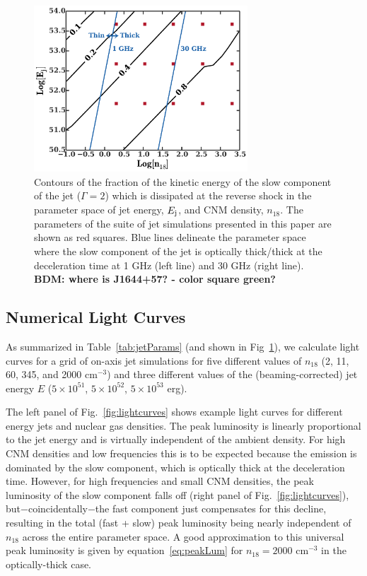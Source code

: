 \documentclass[usenatbib,fleqn]{mnras}
\begin{document}
\begin{figure}
\includegraphics[width=8cm]{diss.pdf}
\caption{\label{fig:diss} Contours of the fraction of the kinetic energy of the slow component of the jet ($\Gamma=2$) which is dissipated at the reverse shock in the parameter space of jet energy, $E_{\rm j}$, and CNM density, $n_{18}$.  The parameters of the suite of jet simulations presented in this paper are shown as red squares.  Blue lines delineate the parameter space where the slow component of the jet is optically thick/thick at the deceleration time at 1 GHz (left line) and 30 GHz (right line).  {\bf BDM: where is J1644+57? - color square green?}}
\end{figure}


\subsection{Numerical Light Curves}
\label{sec:numResults}
As summarized in Table~\ref{tab:jetParams} (and shown in
Fig~\ref{fig:diss}), we calculate light curves for a grid of on-axis
jet simulations for five different values of $n_{18}$ (2, 11, 60, 345,
and 2000 cm$^{-3}$) and three different values of the
(beaming-corrected) jet energy $E$ ($5\times 10^{51}$, $5\times
10^{52}$, $5\times 10^{53}$ erg).

The left panel of Fig.~\ref{fig:lightcurves} shows example light
curves for different energy jets and nuclear gas densities. The peak
luminosity is linearly proportional to the jet energy and is virtually
independent of the ambient density.  For high CNM densities and low
frequencies this is to be expected because the emission is dominated
by the slow component, which is optically thick at the deceleration
time.  However, for high frequencies and small CNM densities, the peak
luminosity of the slow component falls off (right panel of
Fig.~\ref{fig:lightcurves}), but$-$coincidentally$-$the fast component
just compensates for this decline, resulting in the total (fast +
slow) peak luminosity being nearly independent of $n_{18}$ across the
entire parameter space.  A good approximation to this universal peak
luminosity is given by equation~\ref{eq:peakLum} for $n_{18}=2000$
cm$^{-3}$ in the optically-thick case.
\end{document}
